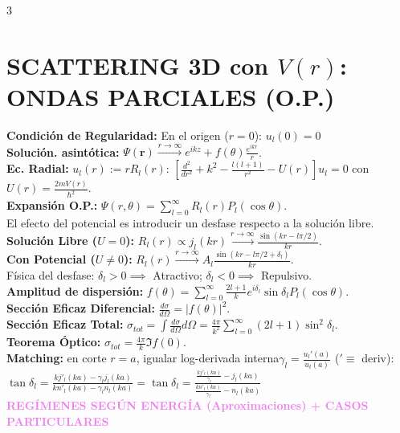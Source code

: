 \documentclass[8pt,a4paper,fleqn]{extarticle} %
\begin{document}
\begin{multicols}{3}
\section{SCATTERING 3D con $V(r)$: ONDAS PARCIALES (O.P.)}
\textbf{Condición de Regularidad:} En el origen ($r=0$): $u_l(0) = 0$\\
\textbf{Solución. asintótica:} $\Psi(\mathbf{r}) \xrightarrow{r\to\infty} e^{ikz} + f(\theta) \frac{e^{ikr}}{r}$.\\
\textbf{Ec. Radial:} $u_l(r) := r R_l(r)$:
$[\frac{d^2}{dr^2} +  k^2 - \frac{l(l+1)}{r^2} - U(r) ] u_l = 0$ con $U(r) = \frac{2mV(r)}{\hbar^2}$.\\
\textbf{Expansión O.P.:} $\Psi(r,\theta) = \sum_{l=0}^\infty R_l(r) P_l(\cos\theta)$. \\
El efecto del potencial es introducir un desfase respecto a la solución libre.
    \\ \textbf{Solución Libre ($U=0$):} $R_l(r) \propto j_l(kr) \xrightarrow{r \to \infty} \frac{\sin(kr - l\pi/2)}{kr}$.
    \\ \textbf{Con Potencial ($U \neq 0$):} $R_l(r) \xrightarrow{r \to \infty} A_l \frac{\sin(kr - l\pi/2 + \delta_l)}{kr}$.\\
Física del desfase: $\delta_l > 0 \implies$ Atractivo; $\delta_l < 0 \implies$ Repulsivo.\\
\textbf{Amplitud de dispersión:} $f(\theta) = \sum_{l=0}^\infty \frac{2l+1}{k} e^{i\delta_l} \sin\delta_l P_l(\cos\theta)$.\\
\textbf{Sección Eficaz Diferencial:} $\frac{d\sigma}{d\Omega} = |f(\theta)|^2$.
    \\ \textbf{Sección Eficaz Total:} $\sigma_{tot} =\int \frac{d\sigma}{d\Omega}d\Omega =  \frac{4\pi}{k^2} \sum_{l=0}^\infty (2l+1) \sin^2 \delta_l$.
    \\ \textbf{Teorema Óptico:} $\sigma_{tot} = \frac{4\pi}{k} \Im f(0)$.
    \\ \textbf{Matching:} en corte $r=a$, igualar log-derivada interna$\gamma_l = \frac{u_l'(a)}{u_l(a)}$ ($' \equiv$ deriv): $ \tan \delta_l = \frac{k j'_l(ka) - \gamma_l j_l(ka)}{k n'_l(ka) - \gamma_l n_l(ka)}  = \tan \delta_l = \frac{\frac{k j'_l(ka)}{\gamma_l} - j_l(ka)}{\frac{k n'_l(ka)}{\gamma_l} - n_l(ka)} $\\
\textcolor{violet}{\textbf{REGÍMENES SEGÚN ENERGÍA (Aproximaciones) + CASOS PARTICULARES}}\\

\end{multicols}
\end{document}

